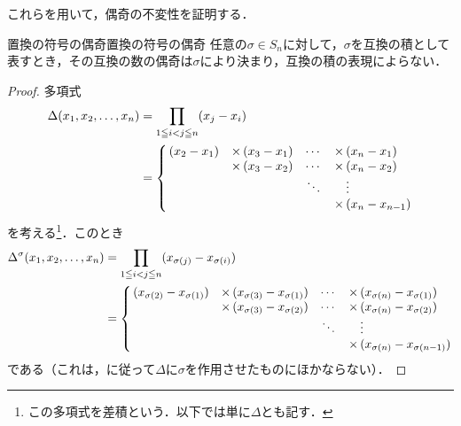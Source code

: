 これらを用いて，偶奇の不変性を証明する．

\begin{prop}{置換の符号の偶奇}{置換の符号の偶奇}
  任意の$\sigma \in S_n$に対して，$\sigma$を互換の積として表すとき，その互換の数の偶奇は$\sigma$により決まり，互換の積の表現によらない．
\end{prop}

\begin{tleftbar}
\begin{proof}
  多項式
\begin{align*}
\Delta(x_1,x_2,\dots,x_n)
  &= \prod_{1 \leqq i < j \leqq n}(x_j-x_i) \\
  &= \left\{\,\begin{array}{@{}c@{\quad}r@{\,}l@{\quad}c@{\quad}r@{\,}l@{}}
(x_2-x_1)
  & \times & (x_3-x_1)
  & \cdots
  & \times & (x_n-x_1)\\
  & \times & (x_3-x_2)
  & \cdots
  & \times & (x_n-x_2)\\
  &        &
  & \ddots
  &        & \vdots\\
  &        &
  &
  & \times & (x_n-x_{n-1})
\end{array}\right.
\end{align*}
  を考える\footnote{この多項式を差積という．以下では単に$\Delta$とも記す．}．このとき
\begin{align*}
\Delta^{\sigma}(x_1,x_2,\dots,x_n)
  &= \prod_{1 \leqq i < j \leqq n}
     (x_{\sigma(j)}-x_{\sigma(i)}) \\
  &= \left\{\,\begin{array}{@{}c@{\quad}r@{\,}l@{\quad}c@{\quad}r@{\,}l@{}}
(x_{\sigma(2)}-x_{\sigma(1)})
  & \times & (x_{\sigma(3)}-x_{\sigma(1)})
  & \cdots
  & \times & (x_{\sigma(n)}-x_{\sigma(1)})\\
  & \times & (x_{\sigma(3)}-x_{\sigma(2)})
  & \cdots
  & \times & (x_{\sigma(n)}-x_{\sigma(2)})\\
  &        &
  & \ddots
  &        & \vdots\\
  &        &
  &
  & \times & (x_{\sigma(n)}-x_{\sigma(n-1)})
\end{array}\right.
\end{align*}
  である（これは，に従って$\Delta$に$\sigma$を作用させたものにほかならない）．


\end{proof}
\end{tleftbar}
